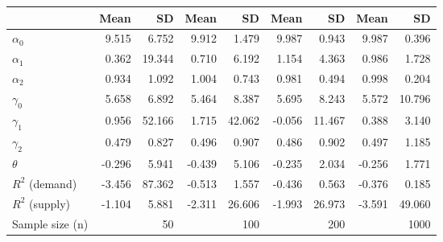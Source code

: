 
\begin{tabular}[t]{lrrrrrrrr}
\toprule
  & Mean & SD & Mean  & SD  & Mean   & SD   & Mean    & SD   \\
\midrule
$\alpha_{0}$ & 9.515 & 6.752 & 9.912 & 1.479 & 9.987 & 0.943 & 9.987 & 0.396\\
$\alpha_{1}$ & 0.362 & 19.344 & 0.710 & 6.192 & 1.154 & 4.363 & 0.986 & 1.728\\
$\alpha_{2}$ & 0.934 & 1.092 & 1.004 & 0.743 & 0.981 & 0.494 & 0.998 & 0.204\\
$\gamma_{0}$ & 5.658 & 6.892 & 5.464 & 8.387 & 5.695 & 8.243 & 5.572 & 10.796\\
$\gamma_{1}$ & 0.956 & 52.166 & 1.715 & 42.062 & -0.056 & 11.467 & 0.388 & 3.140\\
$\gamma_{2}$ & 0.479 & 0.827 & 0.496 & 0.907 & 0.486 & 0.902 & 0.497 & 1.185\\
$\theta$ & -0.296 & 5.941 & -0.439 & 5.106 & -0.235 & 2.034 & -0.256 & 1.771\\
$R^{2}$ (demand) & -3.456 & 87.362 & -0.513 & 1.557 & -0.436 & 0.563 & -0.376 & 0.185\\
$R^{2}$ (supply) & -1.104 & 5.881 & -2.311 & 26.606 & -1.993 & 26.973 & -3.591 & 49.060\\
Sample size (n) &  & 50 &  & 100 &  & 200 &  & 1000\\
\bottomrule
\end{tabular}
